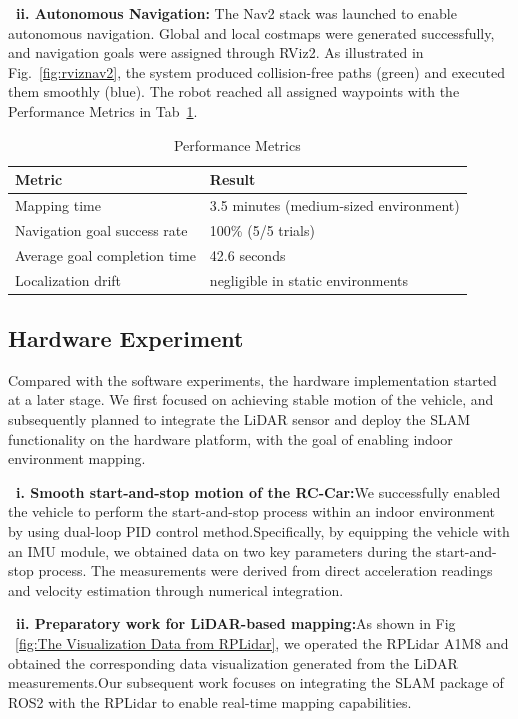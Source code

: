 \documentclass[journal,transmag]{IEEEtran}
\begin{document}
\textbf{~ii. Autonomous Navigation:} The Nav2 stack was launched to enable autonomous navigation. Global and local costmaps were generated successfully, and navigation goals were assigned through RViz2. As illustrated in Fig.~\ref{fig:rviznav2}, the system produced collision-free paths (green) and executed them smoothly (blue). The robot reached all assigned waypoints with the Performance Metrics in Tab~\ref{tab:performance_metrics}. 

\begin{table}[h]
\centering
\caption{Performance Metrics}
\label{tab:performance_metrics} %
\begin{tabular}{l l}
\hline
\textbf{Metric} & \textbf{Result} \\
\hline
Mapping time & 3.5 minutes (medium-sized environment) \\
Navigation goal success rate & 100\% (5/5 trials) \\
Average goal completion time & 42.6 seconds \\
Localization drift & negligible in static environments \\
\hline
\end{tabular}
\end{table}


\subsection{Hardware Experiment}
Compared with the software experiments, the hardware implementation started at a later stage. We first focused on achieving stable motion of the vehicle, and subsequently planned to integrate the LiDAR sensor and deploy the SLAM functionality on the hardware platform, with the goal of enabling indoor environment mapping.

\textbf{~i. Smooth start-and-stop motion of the RC-Car:}We successfully enabled the vehicle to perform the start-and-stop process within an indoor environment by using dual-loop PID control method.Specifically, by equipping the vehicle with an IMU module, we obtained data on two key parameters during the start-and-stop process. The measurements were derived from direct acceleration readings and velocity estimation through numerical integration.

\textbf{~ii. Preparatory work for LiDAR-based mapping:}As shown in Fig ~\ref{fig:The Visualization Data from RPLidar}, we operated the RPLidar A1M8 and obtained the corresponding data visualization generated from the LiDAR measurements.Our subsequent work focuses on integrating the SLAM package of ROS2 with the RPLidar to enable real-time mapping capabilities.
\end{document}
